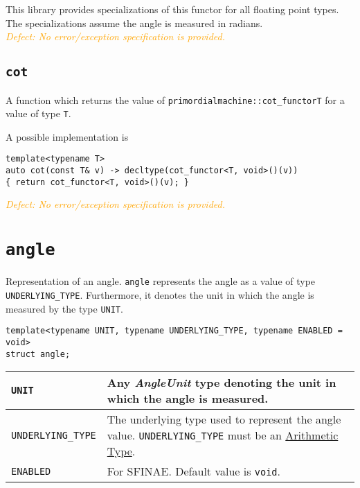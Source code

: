 \documentclass[oneside]{book}
\begin{document}
\noindent{}This library provides specializations of this functor for all floating point types.
The specializations assume the angle is measured in radians.\\

\noindent{}\textcolor{orange}{\textit{Defect: No error/exception specification is provided.}}

\subsection{\texttt{cot}}
A function which returns the value of \texttt{primordialmachine::cot\_functor\textlangle T\textrangle}
for a value of type \texttt{T}.

\noindent{}A possible implementation is
\begin{verbatim}
template<typename T>
auto cot(const T& v) -> decltype(cot_functor<T, void>()(v))
{ return cot_functor<T, void>()(v); }
\end{verbatim}

\noindent{}\textcolor{orange}{\textit{Defect: No error/exception specification is provided.}}
\section{\texttt{angle}}
Representation of an angle. \texttt{angle} represents the angle as a value of type \texttt{UNDERLYING\_TYPE}.
Furthermore, it denotes the unit in which the angle is measured by the type \texttt{UNIT}.
\begin{verbatim}
template<typename UNIT, typename UNDERLYING_TYPE, typename ENABLED = void>
struct angle;
\end{verbatim}

\begin{center}
\begin{tabularx}{\textwidth}{|>{\hsize=0.5\hsize}X|>{\hsize=1.5\hsize}X|}
\hline
\texttt{UNIT}             & Any \textit{AngleUnit} type denoting the unit in which the angle is measured.\\\hline
\texttt{UNDERLYING\_TYPE} & The underlying type used to represent the angle value.
                            \texttt{UNDERLYING\_TYPE} must be an \href{https://en.cppreference.com/w/c/language/arithmetic_types}{Arithmetic Type}.\\\hline
\texttt{ENABLED}          & For SFINAE. Default value is \texttt{void}.\\\hline
\end{tabularx}
\end{center}
\end{document}
